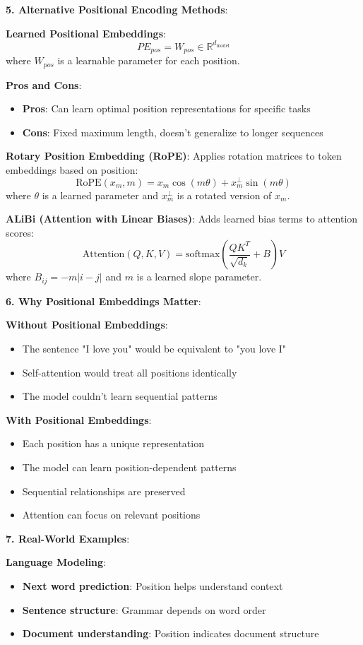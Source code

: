 \textbf{5. Alternative Positional Encoding Methods}:

\textbf{Learned Positional Embeddings}:
\[
	PE_{pos} = W_{pos} \in \mathbb{R}^{d_{\text{model}}}
\]
where \(W_{pos}\) is a learnable parameter for each position.

\textbf{Pros and Cons}:
\begin{itemize}
	\item \textbf{Pros}: Can learn optimal position representations for specific tasks
	\item \textbf{Cons}: Fixed maximum length, doesn't generalize to longer sequences
\end{itemize}

\textbf{Rotary Position Embedding (RoPE)}:
Applies rotation matrices to token embeddings based on position:
\[
	\text{RoPE}(x_m, m) = x_m \cos(m\theta) + x_m^{\perp} \sin(m\theta)
\]
where \(\theta\) is a learned parameter and \(x_m^{\perp}\) is a rotated version of \(x_m\).

\textbf{ALiBi (Attention with Linear Biases)}:
Adds learned bias terms to attention scores:
\[
	\text{Attention}(Q, K, V) = \text{softmax}\left(\frac{QK^T}{\sqrt{d_k}} + B\right)V
\]
where \(B_{ij} = -m|i-j|\) and \(m\) is a learned slope parameter.

\textbf{6. Why Positional Embeddings Matter}:

\textbf{Without Positional Embeddings}:
\begin{itemize}
	\item The sentence "I love you" would be equivalent to "you love I"
	\item Self-attention would treat all positions identically
	\item The model couldn't learn sequential patterns
\end{itemize}

\textbf{With Positional Embeddings}:
\begin{itemize}
	\item Each position has a unique representation
	\item The model can learn position-dependent patterns
	\item Sequential relationships are preserved
	\item Attention can focus on relevant positions
\end{itemize}

\textbf{7. Real-World Examples}:

\textbf{Language Modeling}:
\begin{itemize}
	\item \textbf{Next word prediction}: Position helps understand context
	\item \textbf{Sentence structure}: Grammar depends on word order
	\item \textbf{Document understanding}: Position indicates document structure
\end{itemize}

